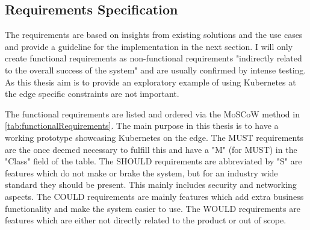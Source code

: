 \subsection{Requirements Specification}
The requirements are based on insights from existing solutions and the use cases and provide a guideline for the implementation in the next section. I will only create functional requirements as non-functional requirements "indirectly related to the overall success of the system"\cite{aauFunctionalRequirements} and are usually confirmed by intense testing. As this thesis aim is to provide an exploratory example of using Kubernetes at the edge specific constraints are not important. 

The functional requirements are listed and ordered via the MoSCoW method in \cref{tab:functionalRequirements}. The main purpose in this thesis is to have a working prototype showcasing Kubernetes on the edge. The MUST requirements are the once deemed necessary to fulfill this and have a "M" (for MUST) in the "Class" field of the table. The SHOULD requirements are abbreviated by "S" are features which do not make or brake the system, but for an industry wide standard they should be present. This mainly includes security and networking aspects. The COULD requirements are mainly features which add extra business functionality and make the system easier to use. The WOULD requirements are features which are either not directly related to the product or out of scope.


